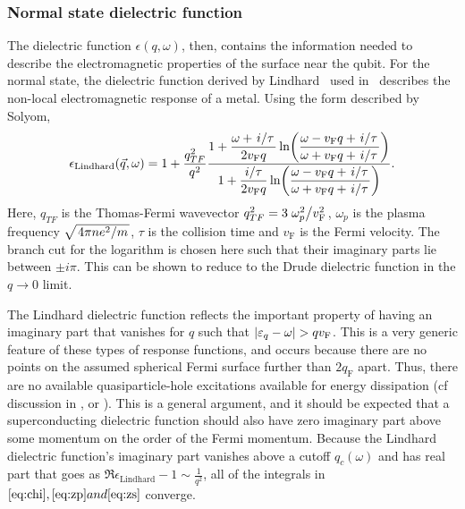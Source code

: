 \documentclass[%
 preprint,
 amsmath,amssymb,
 aps,
]{revtex4-2}
\newcommand{\vf}{v_{\mathrm{F}}}
\begin{document}
\subsubsection{Normal state dielectric function} \label{subsubsec:lindharddielectric}
The dielectric function $\epsilon(q, \omega)$, then, contains the information needed to describe the electromagnetic properties of the surface near the qubit.
For the normal state, the dielectric function derived by Lindhard~\cite{Lindhard} used in~\cite{QubitRelax} describes the non-local electromagnetic response of a metal.
Using the form described by Solyom\cite{SolyomV3},
\begin{equation}
	\epsilon_{\mathrm{Lindhard}}(\vec{q}, \omega) = 1 + \frac{q_{TF}^2}{q^2}\frac{\displaystyle 1 + \frac{\omega + \flatfrac{i}{\tau}}{2 \vf q} \ln(\frac{\omega - \vf q + \flatfrac{i}{\tau}}{\omega + \vf q + \flatfrac{i}{\tau}})}{\displaystyle 1 + \frac{\flatfrac{i}{\tau}}{2 \vf q} \ln(\frac{\omega - \vf q + \flatfrac{i}{\tau}}{\omega + \vf q + \flatfrac{i}{\tau}})}. \label{eq:lindhardsolyom}
\end{equation}
Here, $q_{TF}$ is the Thomas-Fermi wavevector $q_{TF}^2 = 3 \flatfrac{\omega_p^2}{\vf^2}$, $\omega_p$ is the plasma frequency $\sqrt{\flatfrac{4 \pi n e^2}{m}}$, $\tau$ is the collision time and $\vf$ is the Fermi velocity.
The branch cut for the logarithm is chosen here such that their imaginary parts lie between $\pm i \pi$.
This can be shown to reduce to the Drude dielectric function in the $q \rightarrow 0$ limit.

The Lindhard dielectric function reflects the important property of having an imaginary part that vanishes for $q$ such that $\abs{\varepsilon_q - \omega} >  q\vf$.
This is a very generic feature of these types of response functions, and occurs because there are no points on the assumed spherical Fermi surface further than $2 q_{\mathrm{F}}$ apart.
Thus, there are no available quasiparticle-hole excitations available for energy dissipation (cf discussion in \cite{AGD}, \cite{FetterWalecka} or \cite{SolyomV3}).
This is a general argument, and it should be expected that a superconducting dielectric function should also have zero imaginary part above some momentum on the order of the Fermi momentum.
Because the Lindhard dielectric function's imaginary part vanishes above a cutoff $q_c\left(\omega\right)$ and has real part that goes as $\Re \epsilon_{\mathrm{Lindhard}} - 1 \sim \frac{1}{q^2}$, all of the integrals in $\eqref{eq:chi}, \eqref{eq:zp} and \eqref{eq:zs}$ converge.
\end{document}
